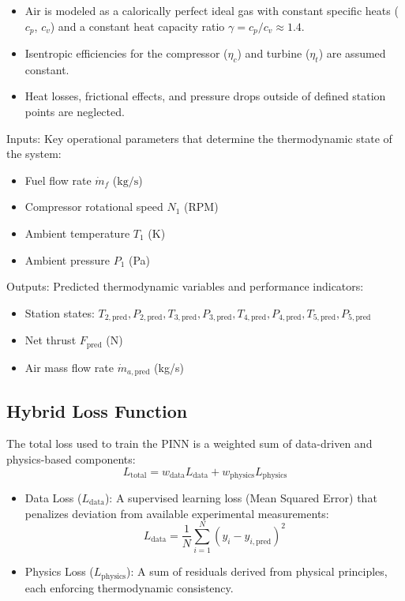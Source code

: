 \documentclass[
  12pt,
  oneside,
  a4paper,
  english,
  brazil]{abntex2}
\begin{document}
\begin{itemize}
    \item Air is modeled as a calorically perfect ideal gas with constant specific heats ($c_p$, $c_v$) and a constant heat capacity ratio $\gamma = c_p / c_v \approx 1.4$.
    \item Isentropic efficiencies for the compressor ($\eta_c$) and turbine ($\eta_t$) are assumed constant.
    \item Heat losses, frictional effects, and pressure drops outside of defined station points are neglected.
\end{itemize}

Inputs: Key operational parameters that determine the thermodynamic
state of the system:

\begin{itemize}
    \item Fuel flow rate $\dot{m}_f$ ($\mathrm{kg/s}$)
    \item Compressor rotational speed $N_1$ (RPM)
    \item Ambient temperature $T_1$ (K)
    \item Ambient pressure $P_1$ (Pa)
\end{itemize}

Outputs: Predicted thermodynamic variables and performance indicators:

\begin{itemize}
    \item Station states: $T_{2,\text{pred}}, P_{2,\text{pred}}, T_{3,\text{pred}}, P_{3,\text{pred}}, T_{4,\text{pred}}, P_{4,\text{pred}}, T_{5,\text{pred}}, P_{5,\text{pred}}$
    \item Net thrust $F_{\text{pred}}$ (N)
    \item Air mass flow rate $\dot{m}_{a, \text{pred}}$ (kg/s)
\end{itemize}

\subsection{Hybrid Loss Function}\label{hybrid-loss-function}

The total loss used to train the PINN is a weighted sum of data-driven
and physics-based components: \[
L_{\text{total}} = w_{\text{data}} L_{\text{data}} + w_{\text{physics}} L_{\text{physics}}
\]

\begin{itemize}
    \item Data Loss ($L_{\text{data}}$): A supervised learning loss (Mean Squared Error) that penalizes deviation from available experimental measurements:
$$
    L_{\text{data}} = \frac{1}{N} \sum_{i=1}^{N} \left( y_i - y_{i,\text{pred}} \right)^2
$$
    
    \item Physics Loss ($L_{\text{physics}}$): A sum of residuals derived from physical principles, each enforcing thermodynamic consistency.
\end{itemize}
\end{document}
